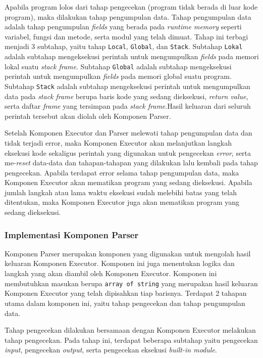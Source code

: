 Apabila program lolos dari tahap pengecekan (program tidak berada di luar kode program), maka dilakukan tahap pengumpulan data. Tahap pengumpulan data adalah tahap pengumpulan \textit{fields} yang berada pada \textit{runtime memory} seperti variabel, fungsi dan metode, serta modul yang telah dimuat. Tahap ini terbagi menjadi 3 subtahap, yaitu tahap \verb|Local|, \verb|Global|, dan \verb|Stack|. Subtahap \verb|Lokal| adalah subtahap mengeksekusi perintah untuk mengumpulkan \textit{fields} pada memori lokal suatu \textit{stack frame}. Subtahap \verb|Global| adalah subtahap mengeksekusi perintah untuk mengumpulkan \textit{fields} pada memori global suatu program. Subtahap \verb|Stack| adalah subtahap mengeksekusi perintah untuk mengumpulkan data pada \textit{stack frame} berupa baris kode yang sedang dieksekusi, \textit{return value}, serta daftar \textit{frame} yang tersimpan pada \textit{stack frame}.Hasil keluaran dari seluruh perintah tersebut akan diolah oleh Komponen Parser.

Setelah Komponen Executor dan Parser melewati tahap pengumpulan data dan tidak terjadi error, maka Komponen Executor akan melanjutkan langkah eksekusi kode sekaligus perintah yang digunakan untuk pengecekan \textit{error}, serta me-\textit{reset} data-data dan tahapan-tahapan yang dilakukan lalu kembali pada tahap pengecekan. Apabila terdapat error selama tahap pengumpulan data, maka Komponen Executor akan mematikan program yang sedang dieksekusi. Apabila jumlah langkah atau lama waktu eksekusi sudah melebihi batas yang telah ditentukan, maka Komponen Executor juga akan mematikan program yang sedang dieksekusi.


\subsubsection{Implementasi Komponen Parser}
Komponen Parser merupakan komponen yang digunakan untuk mengolah hasil keluaran Komponen Executor. Komponen ini juga menentukan logika dan langkah yang akan diambil oleh Komponen Executor. Komponen ini membutuhkan masukan berupa \verb|array of string| yang merupakan hasil keluaran Komponen Executor yang telah dipisahkan tiap barisnya. Terdapat 2 tahapan utama dalam komponen ini, yaitu tahap pengecekan dan tahap pengumpulan data.

Tahap pengecekan dilakukan bersamaan dengan Komponen Executor melakukan tahap pengecekan. Pada tahap ini, terdapat beberapa subtahap yaitu pengecekan \textit{input}, pengecekan \textit{output}, serta pengecekan eksekusi \textit{built-in module}.

